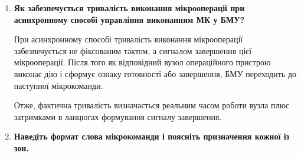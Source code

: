 \documentclass[12pt,a4paper]{article}
\begin{document}
\begin{enumerate}
        \textbf{Переваги синхронного способу:}
        \begin{itemize}
            \item простота реалізації;
            \item простота аналізу часових співвідношень;
            \item добра узгодженість усіх вузлів.
        \end{itemize}

        \textbf{Недоліки синхронного способу:}
        \begin{itemize}
            \item тривалість такту доводиться вибирати за найповільнішою мікрооперацією;
            \item при коротких мікроопераціях частина часу втрачається.
        \end{itemize}

        \textbf{Переваги асинхронного способу:}
        \begin{itemize}
            \item вища потенційна швидкодія;
            \item немає втрат часу на очікування повільнішого фіксованого такту.
        \end{itemize}

        \textbf{Недоліки асинхронного способу:}
        \begin{itemize}
            \item складніша схема керування;
            \item складніший аналіз часових затримок;
            \item важче забезпечити завадостійкість та стабільність роботи.
        \end{itemize}

        \item \textbf{Як забезпечується тривалість виконання мікрооперації при асинхронному способі управління виконанням МК у БМУ?}

        При асинхронному способі тривалість виконання мікрооперації забезпечується не фіксованим тактом, а сигналом завершення цієї мікрооперації. Після того як відповідний вузол операційного пристрою виконає дію і сформує ознаку готовності або завершення, БМУ переходить до наступної мікрокоманди.

        Отже, фактична тривалість визначається реальним часом роботи вузла плюс затримками в ланцюгах формування сигналу завершення.

        \item \textbf{Наведіть формат слова мікрокоманди і поясніть призначення кожної із зон.}


\end{enumerate}
\end{document}
